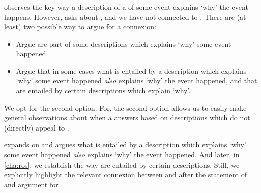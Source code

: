 \subsubsection{\progExII{}}


\begin{note}
  \progExI{} observes the key way a description of a \se{} of some event explains `why' the event happens.
  However, \qWhy{} asks about , and we have not connected  to .
  There are (at least) two possible way to argue for a connexion:
  \begin{itemize}
  \item
    Argue  are part of some descriptions which explains `why' some event happened.
  \item
    Argue that in some cases what is entailed by a description which explains `why' some event happened \emph{also} explains `why' the event happened, and that  are entailed by certain descriptions which explain `why'.
  \end{itemize}
  We opt for the second option.
  For, the second option allows us to easily make general observations about when a \fingfr{} answers \qWhy{} based on descriptions which do not (directly) appeal to .

  \progExII{} expands on \progExI{} and argues what is entailed by a description which explains `why' some event happened \emph{also} explains `why' the event happened.
  And later, in \autoref{cha:ros}, we establish the way  are entailed by certain descriptions.
  Still, we explicitly highlight the relevant connexion between \progExII{} and \fingfr{} after the statement of and argument for \progExII{}.
\end{note}


